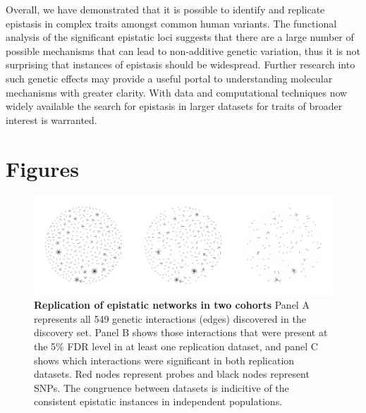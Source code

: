 \documentclass{article}
\begin{document}
Overall, we have demonstrated that it is possible to identify and replicate epistasis in complex traits amongst common human variants. The functional analysis of the significant epistatic loci suggests that there are a large number of possible mechanisms that can lead to non-additive genetic variation, thus it is not surprising that instances of epistasis should be widespread. Further research into such genetic effects may provide a useful portal to understanding molecular mechanisms with greater clarity. With data and computational techniques now widely available the search for epistasis in larger datasets for traits of broader interest is warranted.



\clearpage
\section{Figures}

\begin{figure}[H]
	\includegraphics[width=5in]{hairballs_all_reps.pdf}
	\caption{\textbf{Replication of epistatic networks in two cohorts} Panel A represents all 549 genetic interactions (edges) discovered in the discovery set. Panel B shows those interactions that were present at the 5\% FDR level in at least one replication dataset, and panel C shows which interactions were significant in both replication datasets. Red nodes represent probes and black nodes represent SNPs. The congruence between datasets is indicitive of the consistent epistatic instances in independent populations.}
	\label{fig:fireworks}
\end{figure}
\clearpage
\end{document}
